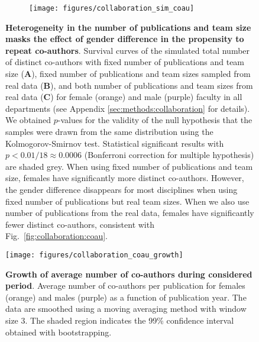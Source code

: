 \begin{figure}[t]
    \begin{subfigure}{\textwidth}
    \begin{center}
        \texttt{[image: figures/collaboration\_sim\_coau]}
        \label{fig:collaboration:sim_coau_a}
    \end{center}
    \end{subfigure}
    \begin{subfigure}{0\textwidth}
        \label{fig:collaboration:sim_coau_b}
    \end{subfigure}
    \begin{subfigure}{0\textwidth}
        \label{fig:collaboration:sim_coau_c}
    \end{subfigure}
\caption[Survival curves of the simulated total number of distinct co-authors.]{\textbf{Heterogeneity in the number of publications and team size masks the effect of gender difference in the propensity to repeat co-authors}. Survival curves of the simulated total number of distinct co-authors with fixed number of publications and team size (\textbf{A}), fixed number of publications and team sizes sampled from real data (\textbf{B}), and both number of publications and team sizes from real data (\textbf{C}) for female (orange) and male (purple) faculty in all departments (see Appendix \ref{sec:methods:collaboration} for details). We obtained $p$-values for the validity of the null hypothesis that the samples were drawn from the same distribution using the Kolmogorov-Smirnov test. Statistical significant results with $p < \mathrm{0.01}/\mathrm{18} \approx \mathrm{0.0006}$ (Bonferroni correction for multiple hypothesis) are shaded grey. When using fixed number of publications and team size, females have significantly more distinct co-authors. However, the gender difference disappears for most disciplines when using fixed number of publications but real team sizes. When we also use number of publications from the real data, females have significantly fewer distinct co-authors, consistent with Fig.~\ref{fig:collaboration:coau}.}
\label{fig:collaboration:sim_coau}
\end{figure}

\clearpage

\begin{figure}[t]
\texttt{[image: figures/collaboration\_coau\_growth]}
\caption[Growth of average number of co-authors during considered period.]{\textbf{Growth of average number of co-authors during considered period}. Average number of co-authors per publication for females (orange) and males (purple) as a function of publication year. The data are smoothed using a moving averaging method with window size 3. The shaded region indicates the 99\% confidence interval obtained with bootstrapping.}
\label{fig:collaboration:coau_growth}
\end{figure}

